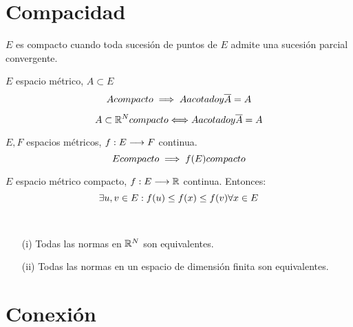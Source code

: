 \section{Compacidad}

\begin{definicion}
    $E$ es compacto cuando toda sucesión de puntos de $E$ admite una sucesión parcial convergente.
\end{definicion}

\begin{prop}
    $E$ espacio métrico, $A\subset E$
    $$A \\ compacto \implies A \\ acotado \\ y \\ \overline{A} = A$$
\end{prop}

\begin{prop}
    $$A \subset \mathbb R^N \\ compacto \Longleftrightarrow A \\ acotado \\ y \\ \overline{A} = A$$
\end{prop}

\begin{teo}[Weierstrass]
    $E,F$ espacios métricos, $f:E \longrightarrow F$ continua.
    $$E \\ compacto \implies f(E) \\ compacto$$
\end{teo}

\begin{prop}
    $E$ espacio métrico compacto, $f:E \longrightarrow \mathbb R$ continua. Entonces:
    $$\exists u,v \in E: f(u) \leq f(x) \leq f(v) \\ \forall x\in E$$
\end{prop}

\begin{teo}[Hausdorff]\\
    \begin{itemize}
        \item[(i)] Todas las normas en $\mathbb R^N$ son equivalentes.
        \item[(ii)] Todas las normas en un espacio de dimensión finita son equivalentes.
    \end{itemize}
\end{teo}

\section{Conexión}

